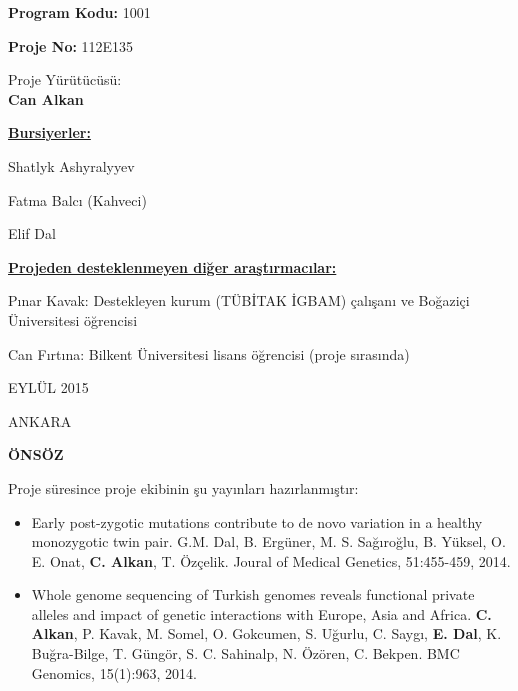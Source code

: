 \documentclass[11pt]{article}
\begin{document}
\bigskip

\bigskip


\thispagestyle{empty}


\begin{center}
\medskip
{\LARGE \textbf{Program Kodu:} 1001}

\bigskip
{\LARGE \textbf{Proje No:} 112E135}

\bigskip
{\LARGE Proje Yürütücüsü:\\
\textbf{Can Alkan}}

\end{center}



\bigskip


\bigskip
\noindent
{\large
\noindent
\underline{\bf Bursiyerler:}

\noindent
Shatlyk Ashyralyyev

\noindent
Fatma Balcı (Kahveci)

\noindent
Elif Dal

\noindent \underline{\bf Projeden desteklenmeyen diğer araştırmacılar:}

\noindent
Pınar Kavak: Destekleyen kurum (TÜBİTAK İGBAM) çalışanı ve Boğaziçi Üniversitesi öğrencisi

\noindent
Can Fırtına: Bilkent Üniversitesi lisans öğrencisi (proje sırasında)


}



\bigskip





\begin{center}
{\Large EYLÜL 2015

\vspace{1mm}
ANKARA}
\end{center}


\linespread{1.5}

\newpage\setlength{\parskip}{3mm} 
\onehalfspacing
\bigskip
\setcounter{page}{1}
\begin{center}
{\LARGE \bf ÖNSÖZ}
\end{center}


Proje süresince proje ekibinin şu yayınları hazırlanmıştır: 

\begin{itemize}
\item Early post-zygotic mutations contribute to de novo variation in a healthy monozygotic twin pair. G.M. Dal, B. Ergüner, M. S. Sağıroğlu, B. Yüksel, O. E. Onat, {\bf C. Alkan}, T. Özçelik. Joural of Medical Genetics, 51:455-459, 2014.
\item Whole genome sequencing of Turkish genomes reveals functional private alleles and impact of genetic interactions with Europe, Asia and Africa. {\bf C. Alkan}, P.  Kavak, M. Somel, O. Gokcumen, 
  S. Uğurlu, C. Saygı, {\bf E. Dal}, K. Buğra-Bilge,  T. Güngör, S. C. Sahinalp, N. Özören, C. Bekpen. BMC Genomics, 15(1):963, 2014.
\end{itemize}
\end{document}
